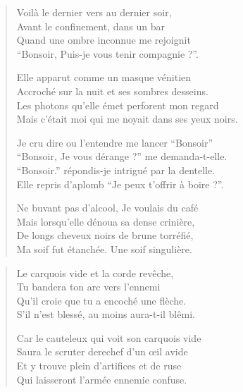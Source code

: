 \begin{verse}
Voilà le dernier vers au dernier soir,\\
Avant le confinement, dans un bar\\
Quand une ombre inconnue me rejoignit\\
\enquote{\newcharacterspeaks{}Bonsoir, Puis-je vous tenir compagnie ?}.

Elle apparut  comme un masque vénitien\\
Accroché sur la nuit et ses sombres desseins.\\
Les photons qu’elle émet perforent mon regard\\
Mais c’était moi qui me noyait dans ses yeux noirs.

Je cru dire ou l’entendre me lancer \enquote{\newcharacterspeaks{}Bonsoir}\\
\enquote{\newcharacterspeaks{}Bonsoir, Je vous dérange ?} me demanda-t-elle.\\
\enquote{\newcharacterspeaks{}Bonsoir.} répondis-je intrigué par la dentelle.\\
Elle repris d’aplomb \enquote{\newcharacterspeaks{}Je peux t’offrir à boire ?}.

Ne buvant pas d’alcool, Je voulais du café\\
Mais lorsqu’elle dénoua sa dense crinière,\\
De longs  cheveux noirs de brune torréfié,\\
Ma soif fut étanchée. Une soif singulière.
\end{verse}

\begin{verse}
Le carquois vide et la corde revêche,\\
Tu bandera ton arc vers l’ennemi\\
Qu’il croie que tu a encoché une flèche.\\
S’il n’est blessé, au moins aura-t-il blêmi.

Car le cauteleux qui voit son carquois vide\\
Saura le scruter derechef d’un œil avide\\
Et y trouve plein d’artifices et de ruse\\
Qui laisseront l’armée ennemie confuse.
\end{verse}

